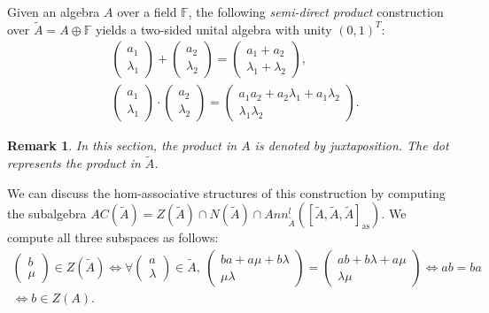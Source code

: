 \documentclass[12pt]{article}
\newtheorem{remark}[theorem]{Remark}
\begin{document}
		Given an algebra $A$ over a field $\mathbb{F}$, the following \textit{semi-direct product} construction over $\tilde{A}=A\oplus \mathbb{F}$ yields a two-sided unital algebra with unity $(0,1)^T$:
		\begin{align*}
			&\begin{pmatrix}
				a_1 \\ \lambda_1
			\end{pmatrix} + \begin{pmatrix}
				a_2 \\ \lambda_2
			\end{pmatrix}=\begin{pmatrix}
				a_1+a_2 \\ \lambda_1+\lambda_2
			\end{pmatrix},\\
			&\begin{pmatrix}
				a_1 \\ \lambda_1
			\end{pmatrix}\cdot\begin{pmatrix}
				a_2 \\ \lambda_2
			\end{pmatrix}=\begin{pmatrix}
				a_1a_2+a_2\lambda_1+a_1\lambda_2 \\ \lambda_1\lambda_2
			\end{pmatrix}.
		\end{align*}
		\begin{remark}
			In this section, the product in $A$ is denoted by juxtaposition. The dot represents the product in $\tilde{A}$.
		\end{remark}
		We can discuss the hom-associative structures of this construction by computing the subalgebra $AC(\tilde{A})=Z(\tilde{A})\cap N(\tilde{A})\cap Ann_{\tilde{A}}^l([\tilde{A},\tilde{A},\tilde{A}]_{\mathrm{as}})$. We compute all three subspaces as follows:
		\begin{multline*}
			\begin{pmatrix}
				b \\ \mu
			\end{pmatrix}\in Z(\tilde{A})\Leftrightarrow\forall \begin{pmatrix}
				a \\ \lambda
			\end{pmatrix}\in \tilde{A},\ \begin{pmatrix}
				ba+a\mu+b\lambda \\ \mu\lambda
			\end{pmatrix}=\begin{pmatrix}
				ab+b\lambda+a\mu \\ \lambda\mu
			\end{pmatrix}\Leftrightarrow ab=ba \\
			\Leftrightarrow b\in Z(A).
		\end{multline*}
\end{document}
